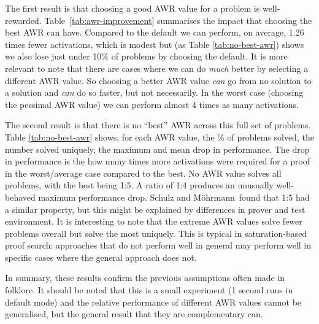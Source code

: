 \documentclass{llncs}
\newcommand{\sandm}{Schulz and M{\"{o}}hrmann}
\begin{document}
The first result is that choosing a good AWR value for a problem is well-rewarded.
Table~\ref{tab:awr-improvement} summarises the impact that choosing the best AWR can have.
Compared to the default we can perform, on average, 1.26 times fewer activations, which is modest but (as Table \ref{tab:no-best-awr}) shows we also lose just under 10\% of problems by choosing the default.
It is more relevant to note that there are cases where we can do \emph{much} better by selecting a different AWR value.
So choosing a better AWR value \emph{can} go from no solution to a solution and \emph{can} do so faster, but not necessarily.
In the worst case (choosing the pessimal AWR value) we can perform almost 4 times as many activations.

The second result is that there is no ``best'' AWR across this full set of problems. Table \ref{tab:no-best-awr} shows, for each AWR value, the \% of problems solved, the number solved uniquely, the maximum and mean drop in performance. The drop in performance is the how many times more activations were required for a proof in the worst/average case compared to the best. No AWR value solves all problems, with the best being 1:5. 
A ratio of 1:4 produces an unusually well-behaved maximum performance drop.
\sandm~found that 1:5 had a similar property, but this might be explained by differences in prover and test environment. It is interesting to note that the extreme AWR values solve fewer problems overall but solve the most uniquely. This is typical in saturation-based proof search: approaches that do not perform well in general may perform well in specific cases where the general approach does not.

In summary, these results confirm the previous assumptions often made in folklore. It should be noted that this is a small experiment (1 second runs in default mode) and the relative performance of different AWR values cannot be generalised, but the general result that they are complementary can.
\end{document}
